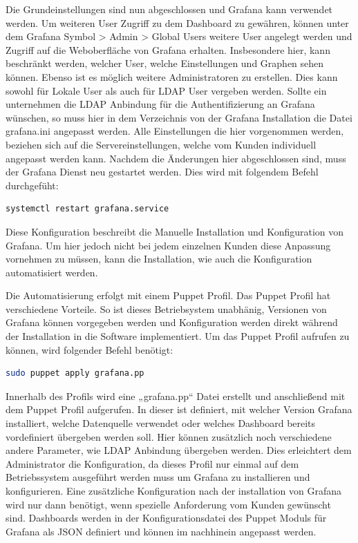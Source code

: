 Die Grundeinstellungen sind nun abgeschlossen und Grafana kann verwendet
werden. Um weiteren User Zugriff zu dem Dashboard zu gewähren, können unter dem
Grafana Symbol > Admin > Global Users weitere User angelegt werden und Zugriff
auf die Weboberfläche von Grafana erhalten. Insbesondere hier, kann beschränkt
werden, welcher User, welche Einstellungen und Graphen sehen können. Ebenso ist
es möglich weitere Administratoren zu erstellen. Dies kann sowohl für Lokale
User als auch für LDAP User vergeben werden.  Sollte ein unternehmen die LDAP
Anbindung für die Authentifizierung an Grafana wünschen, so muss hier in dem
Verzeichnis von der Grafana Installation die Datei grafana.ini angepasst
werden. Alle Einstellungen die hier vorgenommen werden, beziehen sich auf die
Servereinstellungen, welche vom Kunden individuell angepasst werden kann.
Nachdem die Änderungen hier abgeschlossen sind, muss der Grafana Dienst neu
gestartet werden. Dies wird mit folgendem Befehl durchgefüht:

\begin{lstlisting}[language=bash]
systemctl restart grafana.service
\end{lstlisting}

Diese Konfiguration beschreibt die Manuelle Installation und Konfiguration von
Grafana. Um hier jedoch nicht bei jedem einzelnen Kunden diese Anpassung
vornehmen zu müssen, kann die Installation, wie auch die Konfiguration
automatisiert werden.

Die Automatisierung erfolgt mit einem Puppet Profil. Das Puppet Profil hat
verschiedene Vorteile. So ist dieses Betriebsystem unabhänig, Versionen von
Grafana können vorgegeben werden und Konfiguration werden direkt während der
Installation in die Software implementiert. Um das Puppet Profil aufrufen zu
können, wird folgender Befehl benötigt:

\begin{lstlisting}[language=bash]
sudo puppet apply grafana.pp
\end{lstlisting}

Innerhalb des Profils wird eine „grafana.pp“ Datei erstellt und anschließend
mit dem Puppet Profil aufgerufen. In dieser ist definiert, mit welcher Version
Grafana installiert, welche Datenquelle verwendet oder welches Dashboard
bereits vordefiniert übergeben werden soll. Hier können zusätzlich noch
verschiedene andere Parameter, wie LDAP Anbindung übergeben werden. Dies
erleichtert dem Administrator die Konfiguration, da dieses Profil nur einmal
auf dem Betriebssystem ausgeführt werden muss um Grafana zu installieren und
konfigurieren. Eine zusätzliche Konfiguration nach der installation von Grafana
wird nur dann benötigt, wenn spezielle Anforderung vom Kunden gewünscht sind.
Dashboards werden in der Konfigurationsdatei des Puppet Moduls für Grafana als
\gls{JSON} definiert und können im nachhinein angepasst werden.

